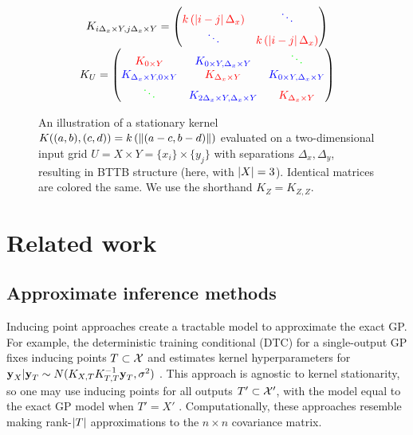 \documentclass[twoside]{article}
\begin{document}
\begin{figure}[!ht]
\begin{center}
$$
\begin{array}{c}
K_{i\Delta_x\times Y,j\Delta_x\times Y}=\begin{pmatrix} {\color{red} k \left({\left|i-j\right|\Delta_x}\right)  }&{\color{blue}\ddots} \\
{\color{blue}\ddots} &{ \color{red} k\left({\left|i-j\right|\Delta_x}\right)}  \end{pmatrix} \\
K_U=\begin{pmatrix} 
 {\color{red} K_{0\times Y} } & {\color{blue} K_{0\times Y,\Delta_x\times Y}}& {\color{green}\ddots }\\
{\color{blue} K_{\Delta_x\times Y, 0\times Y}} & {\color{red} K_{\Delta_x\times Y}} & {\color{blue} K_{0\times Y, \Delta_x\times Y}} \\
{\color{green} \ddots } & {\color{blue}  K_{2\Delta_x\times Y, \Delta_x\times Y}} & {\color{red} K_{\Delta_x\times Y}}
 \end{pmatrix}
\end{array}
$$
\end{center}
\caption{An illustration of a stationary kernel $K((a, b), (c, d))=k\left({\left\| (a-c, b-d) \right\|}\right)$ evaluated on a two-dimensional input grid $U=X\times Y =\{x_i\}\times \{y_j\}$ with separations $\Delta_x,\Delta_y$, resulting in BTTB structure (here, with $\left\vert{X}\right\vert=3$). Identical matrices are colored the same. We use the shorthand $K_Z=K_{Z,Z}$.}
\label{fig:bttb}
\end{figure}

\section{Related work}
\label{sec:related-work}
\subsection{Approximate inference methods}

Inducing point approaches create a tractable model to approximate the exact GP. For example, the deterministic training conditional (DTC) for a single-output GP fixes inducing points $T\subset\mathcal{X}$ and estimates kernel hyperparameters for $\textbf{y}_{X}|\textbf{y}_{T}\sim N(K_{X,T}K_{T,T}^{-1}\textbf{y}_T,\sigma^2)$ \citep{quinonero2005unifying}. This approach is agnostic to kernel stationarity, so one may use inducing points for all outputs $T'\subset \mathcal{X}'$, with the model equal to the exact GP model when $T'={X'}$ \citep{alvarez2010efficient}. Computationally, these approaches resemble making rank-$\left\vert{T}\right\vert$ approximations to the $n\times n$ covariance matrix.
\end{document}
